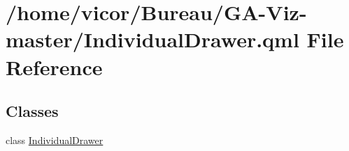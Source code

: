 \hypertarget{_individual_drawer_8qml}{}\section{/home/vicor/\+Bureau/\+G\+A-\/\+Viz-\/master/\+Individual\+Drawer.qml File Reference}
\label{_individual_drawer_8qml}
\subsection*{Classes}
\begin{DoxyCompactItemize}
\item 
class \hyperlink{class_individual_drawer}{Individual\+Drawer}
\end{DoxyCompactItemize}
